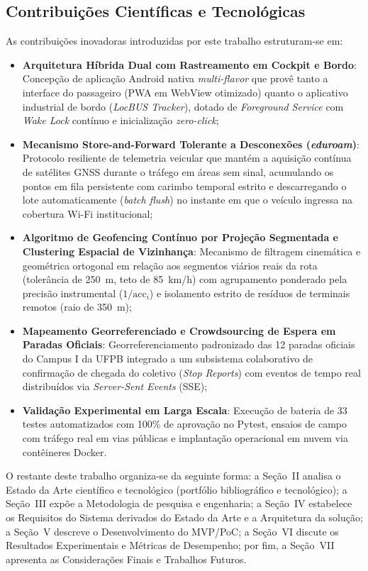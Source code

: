 \documentclass[lettersize,journal]{IEEEtran}
\begin{document}
\subsection{Contribuições Científicas e Tecnológicas}
As contribuições inovadoras introduzidas por este trabalho estruturam-se em:
\begin{itemize}
    \item \textbf{Arquitetura Híbrida Dual com Rastreamento em Cockpit e Bordo}: Concepção de aplicação Android nativa \textit{multi-flavor} que provê tanto a interface do passageiro (PWA em WebView otimizado) quanto o aplicativo industrial de bordo (\textit{LocBUS Tracker}), dotado de \textit{Foreground Service} com \textit{Wake Lock} contínuo e inicialização \textit{zero-click};
    \item \textbf{Mecanismo Store-and-Forward Tolerante a Desconexões (\textit{eduroam})}: Protocolo resiliente de telemetria veicular que mantém a aquisição contínua de satélites GNSS durante o tráfego em áreas sem sinal, acumulando os pontos em fila persistente com carimbo temporal estrito e descarregando o lote automaticamente (\textit{batch flush}) no instante em que o veículo ingressa na cobertura Wi-Fi institucional;
    \item \textbf{Algoritmo de Geofencing Contínuo por Projeção Segmentada e Clustering Espacial de Vizinhança}: Mecanismo de filtragem cinemática e geométrica ortogonal em relação aos segmentos viários reais da rota (tolerância de 250~m, teto de 85~km/h) com agrupamento ponderado pela precisão instrumental ($1/\text{acc}_i$) e isolamento estrito de resíduos de terminais remotos (raio de 350~m);
    \item \textbf{Mapeamento Georreferenciado e Crowdsourcing de Espera em Paradas Oficiais}: Georreferenciamento padronizado das 12 paradas oficiais do Campus I da UFPB integrado a um subsistema colaborativo de confirmação de chegada do coletivo (\textit{Stop Reports}) com eventos de tempo real distribuídos via \textit{Server-Sent Events} (SSE);
    \item \textbf{Validação Experimental em Larga Escala}: Execução de bateria de 33 testes automatizados com 100\% de aprovação no Pytest, ensaios de campo com tráfego real em vias públicas e implantação operacional em nuvem via contêineres Docker.
\end{itemize}

O restante deste trabalho organiza-se da seguinte forma: a Seção~II analisa o Estado da Arte científico e tecnológico (portfólio bibliográfico e tecnológico); a Seção~III expõe a Metodologia de pesquisa e engenharia; a Seção~IV estabelece os Requisitos do Sistema derivados do Estado da Arte e a Arquitetura da solução; a Seção~V descreve o Desenvolvimento do MVP/PoC; a Seção~VI discute os Resultados Experimentais e Métricas de Desempenho; por fim, a Seção~VII apresenta as Considerações Finais e Trabalhos Futuros.
\end{document}
